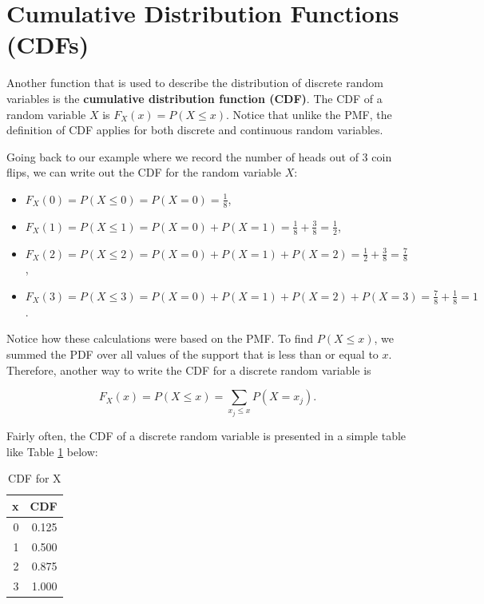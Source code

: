 \documentclass[
]{book}
\providecommand{\tightlist}{%
  \setlength{\itemsep}{0pt}\setlength{\parskip}{0pt}}
\begin{document}
\section{Cumulative Distribution Functions (CDFs)}\label{cumulative-distribution-functions-cdfs}

Another function that is used to describe the distribution of discrete random variables is the \textbf{cumulative distribution function (CDF)}. The CDF of a random variable \(X\) is \(F_X(x) = P(X \leq x)\). Notice that unlike the PMF, the definition of CDF applies for both discrete and continuous random variables.

Going back to our example where we record the number of heads out of 3 coin flips, we can write out the CDF for the random variable \(X\):

\begin{itemize}
\tightlist
\item
  \(F_X(0) = P(X \leq 0) = P(X=0) = \frac{1}{8}\),
\item
  \(F_X(1) = P(X \leq 1) = P(X=0) + P(X=1) = \frac{1}{8} +  \frac{3}{8} = \frac{1}{2}\),
\item
  \(F_X(2) = P(X \leq 2) = P(X=0) + P(X=1) + P(X=2) = \frac{1}{2} + \frac{3}{8} = \frac{7}{8}\),
\item
  \(F_X(3) = P(X \leq 3) = P(X=0) + P(X=1) + P(X=2) + P(X=3) = \frac{7}{8} + \frac{1}{8} = 1\).
\end{itemize}

Notice how these calculations were based on the PMF. To find \(P(X \leq x)\), we summed the PDF over all values of the support that is less than or equal to \(x\). Therefore, another way to write the CDF for a discrete random variable is

\begin{equation} 
F_X(x) = P(X \leq x) = \sum_{x_j \leq x} P(X=x_j).
\label{eq:3-CDF}
\end{equation}

Fairly often, the CDF of a discrete random variable is presented in a simple table like Table \ref{tab:3-cdf-tab} below:

\begin{table}

\caption{\label{tab:3-cdf-tab}CDF for X}
\centering
\begin{tabular}[t]{r|r}
\hline
x & CDF\\
\hline
0 & 0.125\\
\hline
1 & 0.500\\
\hline
2 & 0.875\\
\hline
3 & 1.000\\
\hline
\end{tabular}
\end{table}
\end{document}

